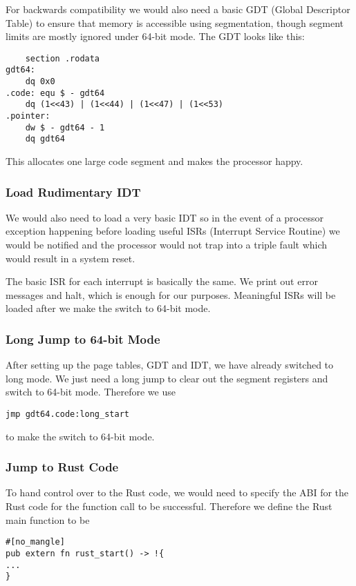 \documentclass[conference]{IEEEtran}
\begin{document}
For backwards compatibility we would also need a basic GDT (Global Descriptor Table) to ensure that memory is accessible using segmentation, though segment limits are mostly ignored under 64-bit mode. The GDT looks like this:

\begin{verbatim}
    section .rodata
gdt64:
    dq 0x0
.code: equ $ - gdt64
    dq (1<<43) | (1<<44) | (1<<47) | (1<<53)
.pointer:
    dw $ - gdt64 - 1
    dq gdt64
\end{verbatim}

This allocates one large code segment and makes the processor happy.

\subsubsection{Load Rudimentary IDT}

We would also need to load a very basic IDT so in the event of a processor exception happening before loading useful ISRs (Interrupt Service Routine) we would be notified and the processor would not trap into a triple fault which would result in a system reset.

The basic ISR for each interrupt is basically the same. We print out error messages and halt, which is enough for our purposes. Meaningful ISRs will be loaded after we make the switch to 64-bit mode.

\subsubsection{Long Jump to 64-bit Mode}

After setting up the page tables, GDT and IDT, we have already switched to long mode. We just need a long jump to clear out the segment registers and switch to 64-bit mode. Therefore we use 
\begin{verbatim}
jmp gdt64.code:long_start
\end{verbatim}
to make the switch to 64-bit mode.

\subsubsection{Jump to Rust Code}

To hand control over to the Rust code, we would need to specify the ABI for the Rust code for the function call to be successful. Therefore we define the Rust main function to be 

\begin{verbatim}
#[no_mangle]
pub extern fn rust_start() -> !{
...
}
\end{verbatim}
\end{document}
